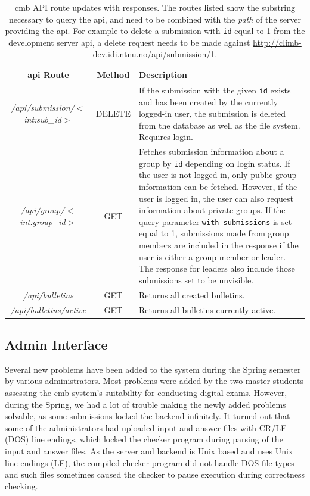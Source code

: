 \begin{table}[h!]
    \centering
    \begin{tabular}{ | c | c | p{4cm} | }
    \hline
    \textbf{\gls{api} Route} & \textbf{Method} & \textbf{Description} \\
    \hline
    \textit{/api/submission/$<$int:sub\_id$>$} & DELETE & If the submission with the given \texttt{id} exists and has been created by the currently logged-in user, the submission is deleted from the database as well as the file system. Requires login.\\ \hline
    \textit{/api/group/$<$int:group\_id$>$} & GET & Fetches submission information about a group by \texttt{id} depending on login status. If the user is not logged in, only public group information can be fetched. However, if the user is logged in, the user can also request information about private groups. If the query parameter \texttt{with-submissions} is set equal to 1, submissions made from group members are included in the response if the user is either a group member or leader. The response for leaders also include those submissions set to be unvisible. \\ \hline
    \textit{/api/bulletins} & GET & Returns all created bulletins. \\ \hline
    \textit{/api/bulletins/active} & GET & Returns all bulletins currently active. \\ \hline
    \end{tabular}
    \caption[Climbing Mont Blanc API route updates with responses]{\gls{cmb} API route updates with responses. The routes listed show the substring necessary to query the \gls{api}, and need to be combined with the \textit{path} of the server providing the \gls{api}. For example to delete a submission with \texttt{id} equal to 1 from the development server \gls{api}, a delete request needs to be made against \url{http://climb-dev.idi.ntnu.no/api/submission/1}.}
    \label{tab:cmb-updated-routes}
\end{table}
\clearpage
\subsection{Admin Interface}
\label{sub-sec:impr-admin}
Several new problems have been added to the system during the Spring semester by various administrators. Most problems were added by the two master students assessing the \gls{cmb} system's suitability for conducting digital exams. However, during the Spring, we had a lot of trouble making the newly added problems solvable, as some submissions locked the backend infinitely. It turned out that some of the administrators had uploaded input and answer files with CR/LF (DOS) line endings, which locked the checker program during parsing of the input and answer files. As the server and backend is Unix based and uses Unix line endings (LF), the compiled checker program did not handle DOS file types and such files sometimes caused the checker to pause execution during correctness checking. \\

